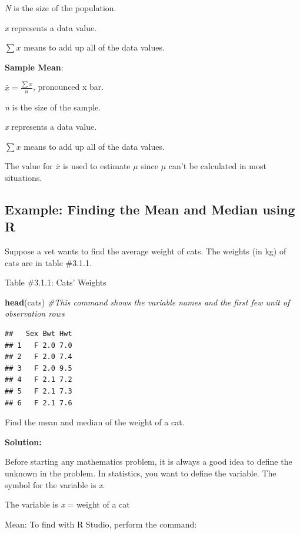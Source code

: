 \documentclass[
]{book}
\newenvironment{Shaded}{\begin{snugshade}}{\end{snugshade}}
\newcommand{\CommentTok}[1]{\textcolor[rgb]{0.56,0.35,0.01}{\textit{#1}}}
\newcommand{\KeywordTok}[1]{\textcolor[rgb]{0.13,0.29,0.53}{\textbf{#1}}}
\newcommand{\NormalTok}[1]{#1}
\begin{document}
\emph{N} is the size of the population.

\emph{x} represents a data value.

\(\sum{x}\) means to add up all of the data values.

\textbf{Sample Mean}:

\(\bar{x}=\frac{\sum{x}}{n}\), pronounced x bar.

\emph{n} is the size of the sample.

\emph{x} represents a data value.

\(\sum{x}\) means to add up all of the data values.

The value for \(\bar{x}\) is used to estimate \(\mu\) since \(\mu\) can't be calculated in most situations.

\hypertarget{example-finding-the-mean-and-median-using-r}{%
\subsection{Example: Finding the Mean and Median using R}\label{example-finding-the-mean-and-median-using-r}}

Suppose a vet wants to find the average weight of cats. The weights (in kg) of cats are in table \#3.1.1.

Table \#3.1.1: Cats' Weights

\begin{Shaded}
\begin{Highlighting}[]
\KeywordTok{head}\NormalTok{(cats) }\CommentTok{#This command shows the variable names and the first few unit of observation rows}
\end{Highlighting}
\end{Shaded}

\begin{verbatim}
##   Sex Bwt Hwt
## 1   F 2.0 7.0
## 2   F 2.0 7.4
## 3   F 2.0 9.5
## 4   F 2.1 7.2
## 5   F 2.1 7.3
## 6   F 2.1 7.6
\end{verbatim}

Find the mean and median of the weight of a cat.

\textbf{Solution:}

Before starting any mathematics problem, it is always a good idea to define the unknown in the problem. In statistics, you want to define the variable. The symbol for the variable is \emph{x}.

The variable is \emph{x} = weight of a cat

Mean:
To find with R Studio, perform the command:
\end{document}
